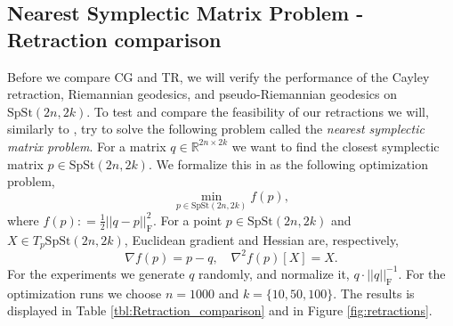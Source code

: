 \subsection{Nearest Symplectic Matrix Problem - Retraction comparison}\label{sec:retraction_comparison}
Before we compare CG and TR, we will verify the performance of the Cayley retraction, Riemannian geodesics, and pseudo-Riemannian geodesics on $\mathrm{SpSt}(2n, 2k)$. 
To test and compare the feasibility of our retractions we will, similarly to \cite[p.~25]{BendokatZimmermann2021}, try to solve the following problem called the \textit{nearest symplectic matrix problem}. For a matrix $q\in \mathbb{R}^{2n\times2k}$ we want to find the closest symplectic matrix $p \in \mathrm{SpSt}(2n, 2k)$. We formalize this in as the following optimization problem, 
%
\begin{equation}\label{eq:nearest_symplectic_matrix}
\operatorname*{min}_{p \in \mathrm{SpSt}(2n, 2k)}f(p),
\end{equation}
%
where $f(p)\colon=\tfrac{1}{2}\lvert \lvert q-p \rvert \rvert^{2}_{\text{F}}$. For a point $p\in \mathrm{SpSt}(2n, 2k)$ and $X\in T_{p}\mathrm{SpSt}(2n, 2k)$, Euclidean gradient and Hessian are, respectively,
%
\begin{equation*}
\nabla f(p)=p-q,\quad \nabla^{2}f(p)[X]=X.
\end{equation*}
%
For the experiments we generate $q$ randomly, and normalize it, $q\cdot\lvert \lvert q \rvert \rvert^{-1}_{\text{F}}$. For the optimization runs we choose $n=1000$ and $k=\{10,50,100\}$. The results is displayed in Table \ref{tbl:Retraction_comparison} and in Figure \ref{fig:retractions}. 


